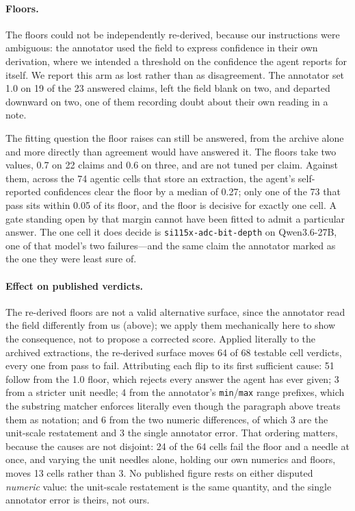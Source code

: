 \documentclass[11pt]{article}
\begin{document}
\paragraph{Floors.}
The floors could not be independently re-derived, because our
instructions were ambiguous: the annotator used the field to express
confidence in their own derivation, where we intended a threshold on
the confidence the agent reports for itself. We report this arm as lost
rather than as disagreement. The annotator set 1.0 on 19 of the 23
answered claims, left the field blank on two, and departed downward on
two, one of them recording doubt about their own reading in a note.

The fitting question the floor raises can still be answered, from the
archive alone and more directly than agreement would have answered it.
The floors take two values, 0.7 on 22 claims and 0.6 on three, and are
not tuned per claim. Against them, across the 74 agentic cells that
store an extraction, the agent's self-reported confidences clear the
floor by a median of 0.27; only one of the 73 that pass sits within 0.05
of its floor, and the floor is decisive for exactly one cell.
A gate standing open by that margin cannot have been fitted to admit a
particular answer. The one cell it does decide is
\texttt{si115x-adc-bit-depth} on Qwen3.6-27B, one of that model's two
failures---and the same claim the annotator marked as the one they were
least sure of.

\paragraph{Effect on published verdicts.}
The re-derived floors are not a valid alternative surface, since the
annotator read the field differently from us (above); we apply them
mechanically here to show the consequence, not to propose a corrected
score. Applied literally to the archived extractions, the re-derived
surface moves 64 of 68 testable cell verdicts, every one from pass to
fail.
Attributing each flip to its first sufficient cause: 51 follow from the
1.0 floor, which rejects every answer the agent has ever given; 3 from a
stricter unit needle; 4 from the annotator's \texttt{min}/\texttt{max}
range prefixes, which the substring matcher enforces literally even
though the paragraph above treats them as notation; and 6 from the two
numeric differences, of which 3 are the unit-scale restatement and 3 the
single annotator error. That ordering matters, because the causes are
not disjoint: 24 of the 64 cells fail the floor and a needle at once,
and varying the unit needles alone, holding our own numerics and floors,
moves 13 cells rather than 3. No published figure rests on either
disputed \emph{numeric} value: the unit-scale restatement is the same
quantity, and the single annotator error is theirs, not ours.
\end{document}
